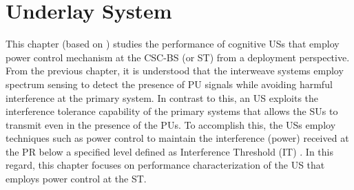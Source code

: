 \chapter{Underlay System}
\label{chap:US}


This chapter (based on ) studies the performance of cognitive USs that employ power control mechanism at the CSC-BS (or ST) from a deployment perspective. 
From the previous chapter, it is understood that the interweave systems employ spectrum sensing to detect the presence of PU signals while avoiding harmful interference at the primary system. In contrast to this, an US exploits the interference tolerance capability of the primary systems that allows the SUs to transmit even in the presence of the PUs. To accomplish this, the USs employ techniques such as power control to maintain the interference (power) received at the PR below a specified level defined as Interference Threshold (IT) \cite{Xing07}. In this regard, this chapter focuses on performance characterization of the US that employs power control at the ST.  

